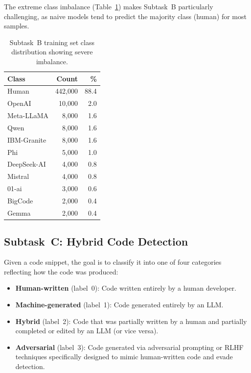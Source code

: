 \documentclass[11pt]{article}
\begin{document}
The extreme class imbalance (Table~\ref{tab:taskB_dist}) makes Subtask~B particularly challenging, as naive models tend to predict the majority class (human) for most samples.

\begin{table}[ht]
\centering
\small
\begin{tabularx}{\columnwidth}{@{}l r r@{}}
\toprule
\textbf{Class} & \textbf{Count} & \textbf{\%} \\ \midrule
Human & 442,000 & 88.4 \\
OpenAI & 10,000 & 2.0 \\
Meta-LLaMA & 8,000 & 1.6 \\
Qwen & 8,000 & 1.6 \\
IBM-Granite & 8,000 & 1.6 \\
Phi & 5,000 & 1.0 \\
DeepSeek-AI & 4,000 & 0.8 \\
Mistral & 4,000 & 0.8 \\
01-ai & 3,000 & 0.6 \\
BigCode & 2,000 & 0.4 \\
Gemma & 2,000 & 0.4 \\ \bottomrule
\end{tabularx}
\caption{Subtask~B training set class distribution showing severe imbalance.}
\label{tab:taskB_dist}
\end{table}

\subsection{Subtask~C: Hybrid Code Detection}

Given a code snippet, the goal is to classify it into one of four categories reflecting how the code was produced:

\begin{itemize}
    \item \textbf{Human-written} (label~0): Code written entirely by a human developer.
    \item \textbf{Machine-generated} (label~1): Code generated entirely by an LLM.
    \item \textbf{Hybrid} (label~2): Code that was partially written by a human and partially completed or edited by an LLM (or vice versa).
    \item \textbf{Adversarial} (label~3): Code generated via adversarial prompting or RLHF techniques specifically designed to mimic human-written code and evade detection.
\end{itemize}
\end{document}
